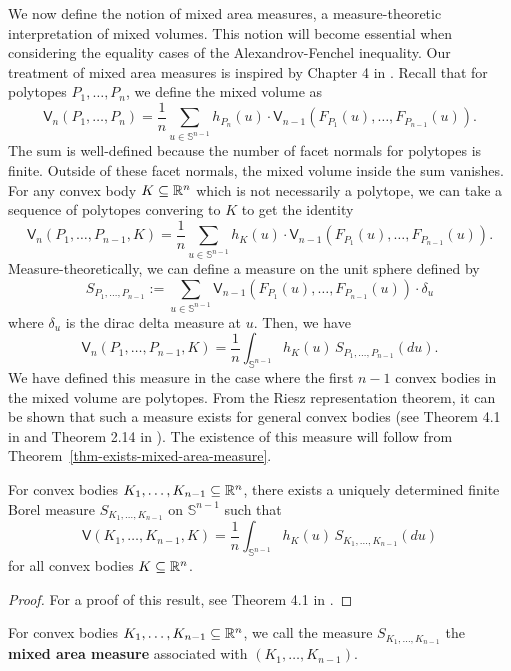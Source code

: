 \documentclass{puthesis-UG}
\begin{document}
We now define the notion of mixed area measures, a measure-theoretic interpretation of mixed volumes. This notion will become essential when considering the equality cases of the Alexandrov-Fenchel inequality. Our treatment of mixed area measures is inspired by Chapter 4 in \cite{Hug2020-ue}. Recall that for polytopes $P_1, \ldots, P_n$, we define the mixed volume as 
\[
	\mathsf{V}_n (P_1, \ldots, P_n) = \frac{1}{n} \sum_{u \in \mathbb{S}^{n-1}} h_{P_n}(u) \cdot \mathsf{V}_{n-1}(F_{P_1}(u), \ldots, F_{P_{n-1}}(u)).
\]
The sum is well-defined because the number of facet normals for polytopes is finite. Outside of these facet normals, the mixed volume inside the sum vanishes. For any convex body $K \subseteq \mathbb{R}^n$ which is not necessarily a polytope, we can take a sequence of polytopes convering to $K$ to get the identity
\[
	\mathsf{V}_n(P_1, \ldots, P_{n-1}, K) = \frac{1}{n} \sum_{u \in \mathbb{S}^{n-1}} h_{K}(u) \cdot \mathsf{V}_{n-1}(F_{P_1}(u), \ldots, F_{P_{n-1}}(u)).
\]
Measure-theoretically, we can define a measure on the unit sphere defined by
\[
	S_{P_1, \ldots, P_{n-1}} := \sum_{u \in \mathbb{S}^{n-1}} \mathsf{V}_{n-1}(F_{P_1}(u), \ldots, F_{P_{n-1}}(u)) \cdot \delta_u
\]
where $\delta_u$ is the dirac delta measure at $u$. Then, we have 
\[
	\mathsf{V}_n(P_1, \ldots, P_{n-1}, K) = \frac{1}{n} \int_{\mathbb{S}^{n-1}} h_{K}(u) \, S_{P_1, \ldots, P_{n-1}}(du).
\]
We have defined this measure in the case where the first $n-1$ convex bodies in the mixed volume are polytopes. From the Riesz representation theorem, it can be shown that such a measure exists for general convex bodies (see Theorem 4.1 in \cite{Hug2020-ue} and Theorem 2.14 in \cite{rudin}). The existence of this measure will follow from Theorem~\ref{thm-exists-mixed-area-measure}. 

\begin{thm} \label{thm-exists-mixed-area-measure}
	For convex bodies $K_1, \ldots, K_{n-1} \subseteq \mathbb{R}^n$, there exists a uniquely determined finite Borel measure $S_{K_1, \ldots, K_{n-1}}$ on $\mathbb{S}^{n-1}$ such that 
	\[
		\mathsf{V}(K_1, \ldots, K_{n-1}, K) = \frac{1}{n} \int_{\mathbb{S}^{n-1}} h_K(u) \, S_{K_1, \ldots, K_{n-1}} (du)
	\]
	for all convex bodies $K \subseteq \mathbb{R}^n$. 
\end{thm}

\begin{proof}
	For a proof of this result, see Theorem 4.1 in \cite{Hug2020-ue}. 
\end{proof}

\begin{defn} \label{def:mixed-area-measure}
	For convex bodies $K_1, \ldots, K_{n-1} \subseteq \mathbb{R}^n$, we call the measure $S_{K_1, \ldots, K_{n-1}}$ the \textbf{mixed area measure} associated with $(K_1, \ldots, K_{n-1})$. 
\end{defn}
\end{document}
